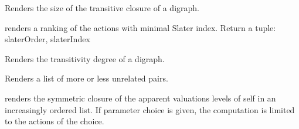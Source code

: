 \documentclass[letterpaper,10pt,english]{sphinxmanual}
\begin{document}
\begin{fulllineitems}
\begin{fulllineitems}
\end{fulllineitems}


\begin{fulllineitems}
\label{techDoc:digraphs.Digraph.computeSizeTransitiveClosure}
Renders the size of the transitive closure of a digraph.

\end{fulllineitems}


\begin{fulllineitems}
\label{techDoc:digraphs.Digraph.computeSlaterOrder}
renders a ranking of the actions with minimal Slater index.
Return a tuple: slaterOrder, slaterIndex

\end{fulllineitems}


\begin{fulllineitems}
\label{techDoc:digraphs.Digraph.computeTransitivityDegree}
Renders the transitivity degree of a digraph.

\end{fulllineitems}


\begin{fulllineitems}
\label{techDoc:digraphs.Digraph.computeUnrelatedPairs}
Renders a list of more or less unrelated pairs.

\end{fulllineitems}


\begin{fulllineitems}
\label{techDoc:digraphs.Digraph.computeValuationLevels}
renders the symmetric closure of the
apparent valuations levels of self
in an increasingly ordered list.
If parameter choice is given, the
computation is limited to the actions
of the choice.


\end{fulllineitems}
\end{fulllineitems}
\end{document}
